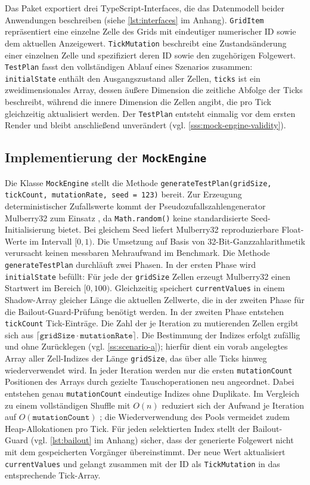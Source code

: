 Das Paket exportiert drei TypeScript-Interfaces, die das Datenmodell beider Anwendungen beschreiben (siehe \cref{lst:interfaces} im Anhang). \texttt{GridItem} repräsentiert eine einzelne Zelle des Grids mit eindeutiger numerischer ID sowie dem aktuellen Anzeigewert. \texttt{TickMutation} beschreibt eine Zustandsänderung einer einzelnen Zelle und spezifiziert deren ID sowie den zugehörigen Folgewert. \texttt{TestPlan} fasst den vollständigen Ablauf eines Szenarios zusammen: \texttt{initialState} enthält den Ausgangszustand aller Zellen, \texttt{ticks} ist ein zweidimensionales Array, dessen äußere Dimension die zeitliche Abfolge der Ticks beschreibt, während die innere Dimension die Zellen angibt, die pro Tick gleichzeitig aktualisiert werden. Der \texttt{TestPlan} entsteht einmalig vor dem ersten Render und bleibt anschließend unverändert (vgl. \cref{sss:mock-engine-validity}).

\subsection{Implementierung der \texttt{MockEngine}}
\label{ss:impl-mockengine}

Die Klasse \texttt{MockEngine} stellt die Methode \texttt{generateTestPlan(gridSize, tickCount, mutationRate, seed\,=\,123)} bereit. Zur Erzeugung deterministischer Zufallswerte kommt der Pseudozufallszahlengenerator Mulberry32 zum Einsatz \cite{ettinger-mulberry32-2017}, da \texttt{Math.random()} keine standardisierte Seed-Initialisierung bietet. Bei gleichem Seed liefert Mulberry32 reproduzierbare Float-Werte im Intervall $[0,1)$. Die Umsetzung auf Basis von 32-Bit-Ganzzahlarithmetik verursacht keinen messbaren Mehraufwand im Benchmark. Die Methode \texttt{generateTestPlan} durchläuft zwei Phasen. In der ersten Phase wird \texttt{initialState} befüllt: Für jede der \texttt{gridSize} Zellen erzeugt Mulberry32 einen Startwert im Bereich $[0, 100)$. Gleichzeitig speichert \texttt{currentValues} in einem Shadow-Array gleicher Länge die aktuellen Zellwerte, die in der zweiten Phase für die Bailout-Guard-Prüfung benötigt werden. In der zweiten Phase entstehen \texttt{tickCount} Tick-Einträge. Die Zahl der je Iteration zu mutierenden Zellen ergibt sich aus $\lceil \mathtt{gridSize} \cdot \mathtt{mutationRate} \rceil$. Die Bestimmung der Indizes erfolgt zufällig und ohne Zurücklegen (vgl. \cref{ss:scenario-a}); hierfür dient ein vorab angelegtes Array aller Zell-Indizes der Länge \texttt{gridSize}, das über alle Ticks hinweg wiederverwendet wird. In jeder Iteration werden nur die ersten \texttt{mutationCount} Positionen des Arrays durch gezielte Tauschoperationen neu angeordnet. Dabei entstehen genau \texttt{mutationCount} eindeutige Indizes ohne Duplikate. Im Vergleich zu einem vollständigen Shuffle mit $O(n)$ reduziert sich der Aufwand je Iteration auf $O(\mathtt{mutationCount})$ \cite{knuth-taocp2-1998}; die Wiederverwendung des Pools vermeidet zudem Heap-Allokationen pro Tick.
Für jeden selektierten Index stellt der Bailout-Guard (vgl. \cref{lst:bailout} im Anhang) sicher, dass der generierte Folgewert nicht mit dem gespeicherten Vorgänger übereinstimmt. Der neue Wert aktualisiert \texttt{currentValues} und gelangt zusammen mit der ID als \texttt{TickMutation} in das entsprechende Tick-Array.

